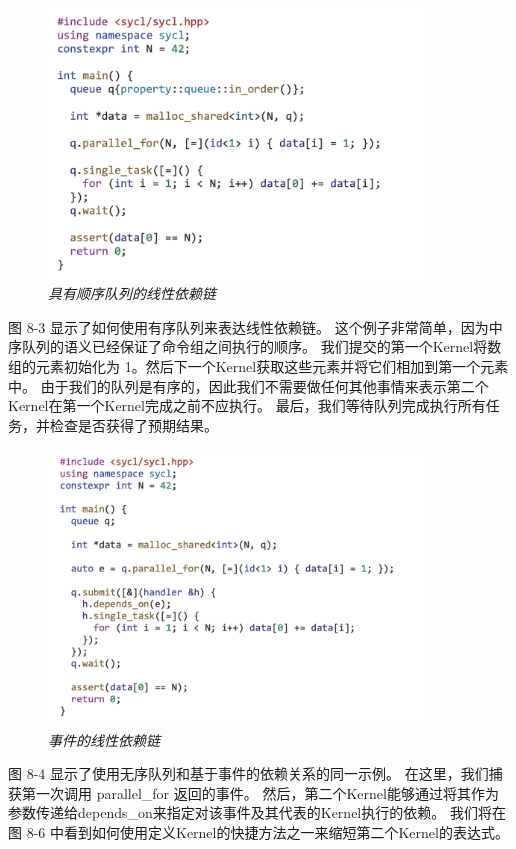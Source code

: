 \begin{figure}[H]
	\centering
	\includegraphics[width=0.9\textwidth]{figs/F8.3.png}
	\caption{\textit{具有顺序队列的线性依赖链 }}
\end{figure}

图 8-3 显示了如何使用有序队列来表达线性依赖链。 这个例子非常简单，因为中序队列的语义已经保证了命令组之间执行的顺序。 
我们提交的第一个Kernel将数组的元素初始化为 1。然后下一个Kernel获取这些元素并将它们相加到第一个元素中。 
由于我们的队列是有序的，因此我们不需要做任何其他事情来表示第二个Kernel在第一个Kernel完成之前不应执行。 
最后，我们等待队列完成执行所有任务，并检查是否获得了预期结果。

\begin{figure}[H]
	\centering
	\includegraphics[width=0.9\textwidth]{figs/F8.4.png}
	\caption{\textit{事件的线性依赖链 }}
\end{figure}

图 8-4 显示了使用无序队列和基于事件的依赖关系的同一示例。 在这里，我们捕获第一次调用 parallel\_for 返回的事件。 
然后，第二个Kernel能够通过将其作为参数传递给depends\_on来指定对该事件及其代表的Kernel执行的依赖。 
我们将在图 8-6 中看到如何使用定义Kernel的快捷方法之一来缩短第二个Kernel的表达式。

